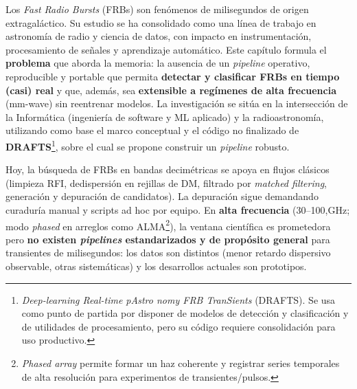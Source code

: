 % 
% 
% 
% 
% 

Los \textit{Fast Radio Bursts} (FRBs) son fenómenos de milisegundos de origen extragaláctico. Su estudio se ha consolidado como una línea de trabajo en astronomía de radio y ciencia de datos, con impacto en instrumentación, procesamiento de señales y aprendizaje automático. Este capítulo formula el \textbf{problema} que aborda la memoria: la ausencia de un \textit{pipeline} operativo, reproducible y portable que permita \textbf{detectar y clasificar FRBs en tiempo (casi) real} y que, además, sea \textbf{extensible a regímenes de alta frecuencia} (mm-wave) sin reentrenar modelos. La investigación se sitúa en la intersección de la Informática (ingeniería de software y ML aplicado) y la radioastronomía, utilizando como base el marco conceptual y el código no finalizado de \textbf{DRAFTS}\footnote{\emph{Deep-learning Real-time pAstro nomy FRB TranSients} (DRAFTS). Se usa como punto de partida por disponer de modelos de detección y clasificación y de utilidades de procesamiento, pero su código requiere consolidación para uso productivo.}, sobre el cual se propone construir un \textit{pipeline} robusto.

\medskip
Hoy, la búsqueda de FRBs en bandas decimétricas se apoya en flujos clásicos (limpieza RFI, dedispersión en rejillas de DM, filtrado por \emph{matched filtering}, generación y depuración de candidatos). La depuración sigue demandando curaduría manual y scripts ad hoc por equipo. En \textbf{alta frecuencia} (30--100,GHz; modo \emph{phased} en arreglos como ALMA\footnote{\emph{Phased array} permite formar un haz coherente y registrar series temporales de alta resolución para experimentos de transientes/pulsos.}), la ventana científica es prometedora pero \textbf{no existen \textit{pipelines} estandarizados y de propósito general} para transientes de milisegundos: los datos son distintos (menor retardo dispersivo observable, otras sistemáticas) y los desarrollos actuales son prototipos.

